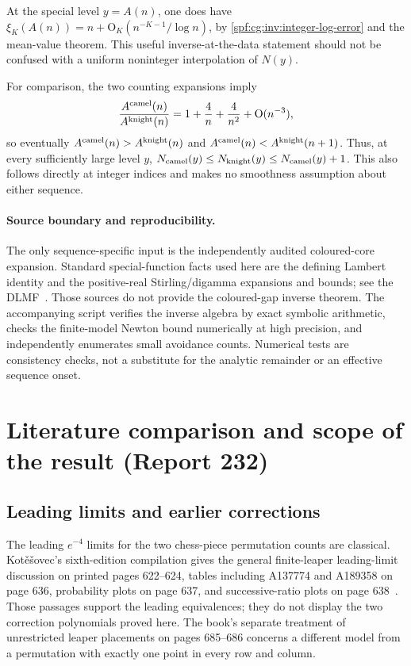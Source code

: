 \documentclass[11pt]{article}
\numberwithin{equation}{section}
\theoremstyle{definition}
\theoremstyle{remark}
\theoremstyle{definition}
\newcommand{\bigO}{\mathrm O}
\begin{document}
At the special level $y=A(n)$, one does have
$\xi_K(A(n))=n+\bigO_K(n^{-K-1}/\log n)$, by
\eqref{spf:cg:inv:integer-log-error} and the mean-value theorem. This useful
inverse-at-the-data statement should not be confused with a uniform
noninteger interpolation of $N(y)$.

For comparison, the two counting expansions imply
\[
 \frac{A^{\rm camel}(n)}{A^{\rm knight}(n)}
 =1+\frac4n+\frac4{n^2}+\bigO(n^{-3}),
\]
so eventually $A^{\rm camel}(n)>A^{\rm knight}(n)$ and
$A^{\rm camel}(n)<A^{\rm knight}(n+1)$. Thus, at every sufficiently large
level $y$, $N_{\rm camel}(y)\leq N_{\rm knight}(y)\leq N_{\rm camel}(y)+1$.
This also follows directly at integer indices and makes no smoothness
assumption about either sequence.

\paragraph{Source boundary and reproducibility.}
The only sequence-specific input is the independently audited coloured-core
expansion. Standard special-function facts used here are the defining
Lambert identity and the positive-real Stirling/digamma expansions and
bounds; see the DLMF~\cite{dlmfW,dlmfGamma,cgDlmfPsi}. Those sources do not
provide the coloured-gap inverse theorem. The accompanying script verifies
the inverse algebra by exact symbolic arithmetic, checks the finite-model
Newton bound numerically at high precision, and independently enumerates
small avoidance counts. Numerical tests are consistency checks, not a
substitute for the analytic remainder or an effective sequence onset.

\section{Literature comparison and scope of the result (Report 232)}
\label{spf:cg:sec:literature}

\subsection{Leading limits and earlier corrections}
The leading $e^{-4}$ limits for the two chess-piece permutation counts are
classical. Kot\v e\v sovec's sixth-edition compilation gives the general
finite-leaper leading-limit discussion on printed pages 622--624, tables
including A137774 and A189358 on page 636, probability plots on page 637,
and successive-ratio plots on page 638~\cite{cgKotesovec}. Those passages
support the leading equivalences; they do not display the two correction
polynomials proved here. The book's separate treatment of unrestricted
leaper placements on pages 685--686 concerns a different model from a
permutation with exactly one point in every row and column.
\end{document}
